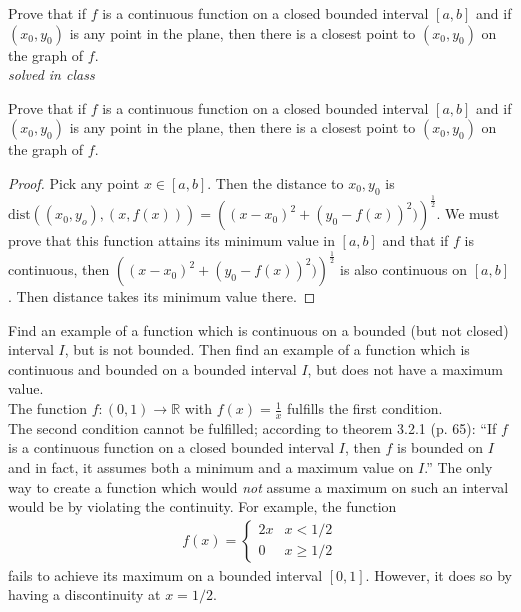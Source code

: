 \documentclass[12pt]{book}
\newcommand{\R}{\mathbb{R}}
\newenvironment{exercise}[2][Exercise]{\begin{trivlist}
\item[\hskip \labelsep {\bfseries #1}\hskip \labelsep {\bfseries #2.}]}{\end{trivlist}}
\begin{document}
\begin{exercise}{3.2.3}
Prove that if $f$ is a continuous function on a closed bounded interval $[a,b]$ and if $(x_0, y_0)$ is any point in the plane, then there is a closest point to $(x_0,y_0)$ on the graph of $f$.\\

\emph{solved in class}
\end{exercise}

\begin{exercise}{3.2.3}
    Prove that if $f$ is a continuous function on a closed bounded interval $[a,b]$ and if $(x_0, y_0)$ is any point in the plane, then there is a closest point to $(x_0,y_0)$ on the graph of $f$. 
    
    \begin{proof}
    Pick any point $x \in [a,b]$. Then the distance to $x_0,y_0$ is $\text{dist}\left( (x_0,y_o), (x,f(x)) \right) = \left( (x-x_0)^2 + (y_0-f(x))^2)\right)^{\frac{1}{2}}$. We must prove that this function attains its minimum value in $[a,b]$ and that if $f$ is continuous, then $\left( (x-x_0)^2 + (y_0-f(x))^2)\right)^{\frac{1}{2}}$ is also continuous on $[a,b]$. Then distance takes its minimum value there.
    \end{proof}
\end{exercise}


\begin{exercise}{3.2.4}
Find an example of a function which is continuous on a bounded (but not closed) interval $I$, but is not bounded. Then find an example of a function which is continuous and bounded on a bounded interval $I$, but does not have a maximum value. \\

The function $f: (0,1) \to \R$ with $f(x)=\frac{1}{x}$ fulfills the first condition. \\
The second condition cannot be fulfilled; according to theorem 3.2.1 (p. 65): ``If $f$ is a continuous function on a closed bounded interval $I$, then $f$ is bounded on $I$ and in fact, it assumes both a minimum and a maximum value on $I$.'' The only way to create a function which would \emph{not} assume a maximum on such an interval would be by violating the continuity. For example, the function	
	\begin{align*}
	f(x) =
		\begin{cases}
		2x & x< 1/2 \\
		0  & x \geq 1/2
		\end{cases}
	\end{align*}
fails to achieve its maximum on a bounded interval $[0,1]$. However, it does so by having a discontinuity at $x = 1/2$.
\end{exercise}
\end{document}
